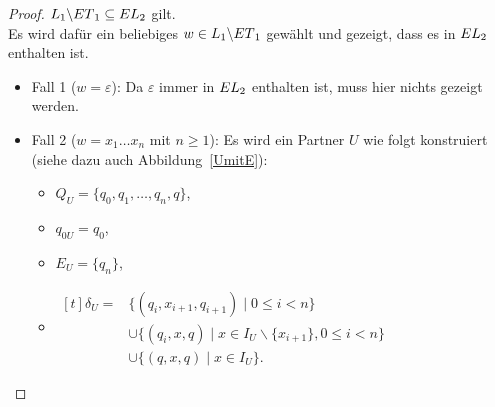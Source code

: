 \begin{proof}
  $L_1\backslash ET{}_1\subseteq EL{}_2$ gilt.\\
  Es wird dafür ein beliebiges $w\in L_1\backslash ET{}_1$ gewählt und
  gezeigt, dass es in $EL{}_2$ enthalten ist.
  \begin{itemize}
    \item Fall 1 ($w=\varepsilon$): Da $\varepsilon$ immer in $EL{}_2$
      enthalten ist, muss hier nichts gezeigt werden.
    \item Fall 2 ($w=x_1\dots x_n$ mit $n\geq 1$): Es wird ein
      Partner $U$ wie folgt konstruiert (siehe dazu auch Abbildung~\ref{UmitE}):
      \begin{itemize}
        \item $Q_U=\{q_0,q_1,\dots ,q_n,q\}$,
        \item $q_{0U}=q_0$,
        \item $E_U=\{q_n\}$,
        \item $\begin{aligned}[t]
            \delta _U=&\{(q_i,x_{i+1},q_{i+1})\mid 0\leq i< n\}\\
                      &\cup\{(q_i,x,q)\mid x\in I_U\backslash\{x_{i+1}\},0\leq
          i< n\}\\
          &\cup\{(q,x,q)\mid x\in I_U\}.
              \end{aligned}$
      \end{itemize}
      \begin{figure} [h!tbp]
      \begin{center}
\end{center}
\end{figure}
\end{itemize}
\end{proof}
